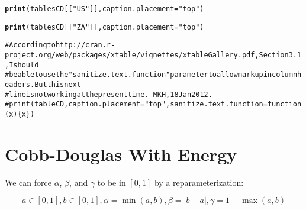 \documentclass[preprint,authoryear,12pt]{elsarticle}\usepackage{graphicx, color}
\makeatletter
\newcommand{\hlfunctioncall}[1]{\textcolor[rgb]{0.501960784313725,0,0.329411764705882}{\textbf{#1}}}%
\newcommand{\hlstring}[1]{\textcolor[rgb]{0.6,0.6,1}{#1}}%
\newcommand{\hlcomment}[1]{\textcolor[rgb]{0.180392156862745,0.6,0.341176470588235}{#1}}%
\newenvironment{kframe}{%
 \def\at@end@of@kframe{}%
 \ifinner\ifhmode%
  \def\at@end@of@kframe{\end{minipage}}%
  \begin{minipage}{\columnwidth}%
 \fi\fi%
 \def\FrameCommand##1{\hskip\@totalleftmargin \hskip-\fboxsep
 \colorbox{shadecolor}{##1}\hskip-\fboxsep
     \hskip-\linewidth \hskip-\@totalleftmargin \hskip\columnwidth}%
 \MakeFramed {\advance\hsize-\width
   \@totalleftmargin\z@ \linewidth\hsize
   \@setminipage}}%
 {\par\unskip\endMakeFramed%
 \at@end@of@kframe}
\makeatother
\begin{document}
\begin{kframe}
\begin{alltt}
\hlfunctioncall{print}(tablesCD[[\hlstring{"US"}]], caption.placement=\hlstring{"top"})
\end{alltt}


{\ttfamily\noindent\bfseries\color{errorcolor}{Error: error in evaluating the argument 'x' in selecting a method for function 'print': Error: object 'tablesCD' not found}}\begin{alltt}
\hlfunctioncall{print}(tablesCD[[\hlstring{"ZA"}]], caption.placement=\hlstring{"top"})
\end{alltt}


{\ttfamily\noindent\bfseries\color{errorcolor}{Error: error in evaluating the argument 'x' in selecting a method for function 'print': Error: object 'tablesCD' not found}}\begin{alltt}
\hlcomment{# According to http://cran.r-project.org/web/packages/xtable/vignettes/xtableGallery.pdf, Section 3.1, I should }
\hlcomment{# be able to use the "sanitize.text.function" parameter to allow markup in column headers. But this next}
\hlcomment{# line is not working at the present time. --MKH, 18 Jan 2012.}
\hlcomment{# print(tableCD, caption.placement="top", sanitize.text.function = function(x)\{x\})}
\end{alltt}
\end{kframe}


\section{Cobb-Douglas With Energy}

We can force $\alpha$, $\beta$, and $\gamma$ to be in $[0,1]$ by a reparameterization:

\[ a \in[0,1], b \in [0,1], \alpha=\min(a,b), \beta=|b-a|, \gamma = 1-\max(a,b) \]
\end{document}

